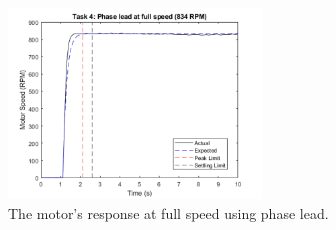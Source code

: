 \documentclass[11pt, onecolumn]{article}
\begin{document}
\begin{figure}[h!]
    \centering
    \includegraphics[width=0.6\textwidth]{q4-phase.png}
    \caption{The motor's response at full speed using phase lead.}
    \label{fig:q4-phase}
\end{figure}
\newpage


\end{document}
